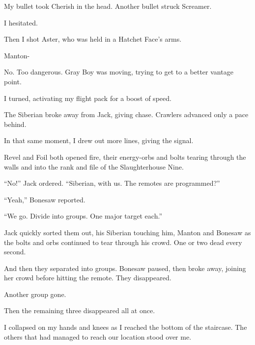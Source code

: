 My bullet took Cherish in the head.  Another bullet struck Screamer.



I hesitated.



Then I shot Aster, who was held in a Hatchet Face's arms.



Manton-



No.  Too dangerous.  Gray Boy was moving, trying to get to a better vantage point.



I turned, activating my flight pack for a boost of speed.



The Siberian broke away from Jack, giving chase.  Crawlers advanced only a pace behind.



In that same moment, I drew out more lines, giving the signal.



Revel and Foil both opened fire, their energy-orbs and bolts tearing through the walls and into the rank and file of the Slaughterhouse Nine.



``No!''  Jack ordered.  ``Siberian, with us.  The remotes are programmed?''



``Yeah,'' Bonesaw reported.



``We go.  Divide into groups.  One major target each.''



Jack quickly sorted them out, his Siberian touching him, Manton and Bonesaw as the bolts and orbs continued to tear through his crowd.  One or two dead every second.



And then they separated into groups.  Bonesaw paused, then broke away, joining her crowd before hitting the remote.  They disappeared.



Another group gone.



Then the remaining three disappeared all at once.



I collapsed on my hands and knees as I reached the bottom of the staircase.  The others that had managed to reach our location stood over me.



